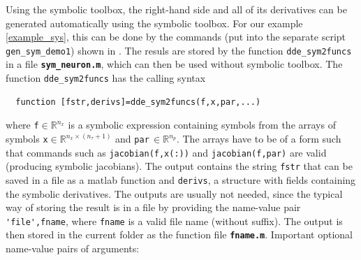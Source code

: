 \documentclass[10pt]{scrartcl}
\newcommand{\file}[1]{\textbf{\texttt{#1}}}
\newcommand{\blist}[1]{\mbox{\lstinline!#1!}}
\begin{document}
Using the symbolic toolbox, the right-hand side and all of its
derivatives can be generated automatically using the symbolic
toolbox. For our example \eqref{example_sys}, this can be done by the
commands (put into the separate script \texttt{gen\_sym\_demo1}) shown
in .  The resuls are stored by the function
\blist{dde_sym2funcs} in a file \file{sym\_neuron.m}, which can then
be used without symbolic toolbox. The function \blist{dde_sym2funcs} has the calling syntax
\begin{lstlisting}
  function [fstr,derivs]=dde_sym2funcs(f,x,par,...)
\end{lstlisting}
where \blist{f}$\in\mathbb{R}^{n_x}$ is a symbolic expression containing
symbols from the arrays of symbols \blist{x}$\in\mathbb{R}^{n_x\times(n_\tau+1)}$
and \blist{par}\,$\in\mathbb{R}^{n_p}$. The arrays have to be of a form such
that commands such as \blist{jacobian(f,x(:))} and
\blist{jacobian(f,par)} are valid (producing symbolic jacobians). The
output contains the string \blist{fstr} that can be saved in a file as
a matlab function and \blist{derivs}, a structure with fields
containing the symbolic derivatives. The outputs are usually not
needed, since the typical way of storing the result is in a file by
providing the name-value pair \blist{'file',fname}, where
\blist{fname} is a valid file name (without suffix). The output is then stored in the current folder as the
function file \file{fname.m}. Important optional name-value pairs of arguments:
\end{document}
